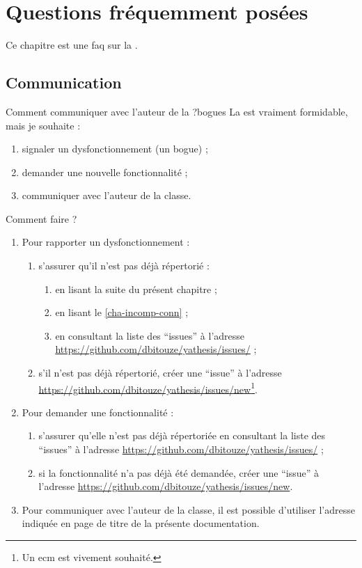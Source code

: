 \chapter{Questions fréquemment posées}\label{cha-faq}

Ce chapitre est une \gls{faq}  sur la \yatCl{}.

\section{Communication}
\label{sec-communication}

\begin{dbfaq}{Comment communiquer avec l'auteur de la \yatCl{} ?}{bogues}
  La \yatCl{} est vraiment formidable, mais je souhaite :
  \begin{enumerate}
  \item signaler un dysfonctionnement (un bogue) ;
  \item demander une nouvelle fonctionnalité ;
  \item communiquer avec l'auteur de la classe.
  \end{enumerate}
  Comment faire ?
  \tcblower
  \begin{enumerate}
  \item Pour rapporter un dysfonctionnement :
    \begin{enumerate}
    \item s'assurer qu'il n'est pas déjà répertorié :
      \begin{enumerate}
      \item en lisant la suite du présent chapitre ;
      \item en lisant le \vref{cha-incomp-conn} ;
      \item en consultant la liste des \enquote{issues} à l'adresse
        \url{https://github.com/dbitouze/yathesis/issues/} ;
      \end{enumerate}
    \item s'il n'est pas déjà répertorié, créer une \enquote{issue} à l'adresse
      \url{https://github.com/dbitouze/yathesis/issues/new}\footnote{Un
        \gls{ecm} est vivement souhaité.}.
    \end{enumerate}
  \item Pour demander une fonctionnalité :
    \begin{enumerate}
    \item s'assurer qu'elle n'est pas déjà répertoriée en
      consultant la liste des \enquote{issues} à l'adresse
      \url{https://github.com/dbitouze/yathesis/issues/} ;
    \item si la fonctionnalité n'a pas déjà été demandée, créer une
      \enquote{issue} à l'adresse
      \url{https://github.com/dbitouze/yathesis/issues/new}.
    \end{enumerate}
  \item Pour communiquer avec l'auteur de la classe, il est possible d'utiliser
    l'adresse indiquée en page de titre de la présente documentation.
  \end{enumerate}
\end{dbfaq}

